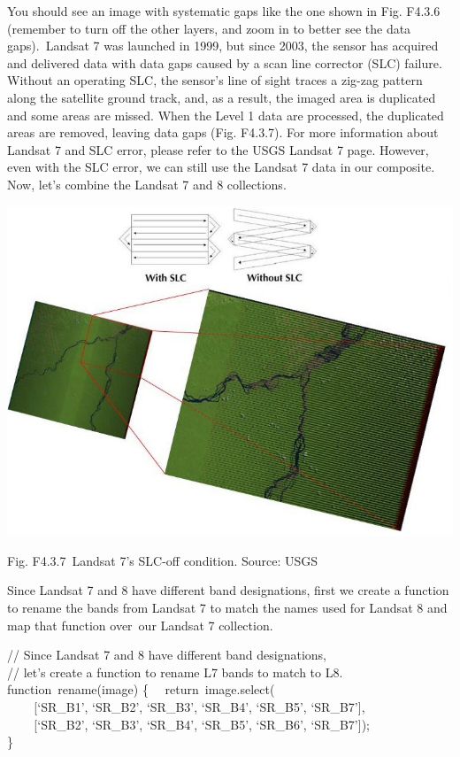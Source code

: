 \documentclass[
  letterpaper,
  DIV=11,
  numbers=noendperiod]{scrreprt}
\begin{document}
You should see an image with systematic gaps like the one shown in Fig.
F4.3.6 (remember to turn off the other layers, and zoom in to better see
the data gaps).~Landsat 7 was launched in 1999, but since 2003, the
sensor has acquired and delivered data with data gaps caused by a scan
line corrector (SLC) failure. Without an operating SLC, the sensor's
line of sight traces a zig-zag pattern along the satellite ground track,
and, as a result, the imaged area is duplicated and some areas are
missed. When the Level 1 data are processed, the duplicated areas are
removed, leaving data gaps (Fig. F4.3.7). For more information about
Landsat 7 and SLC error, please refer to the USGS Landsat 7 page.
However, even with the SLC error, we can still use the Landsat 7 data in
our composite. Now, let's combine the Landsat 7 and 8 collections.

\includegraphics{./F4/image54.png}

Fig. F4.3.7~Landsat 7's SLC-off condition. Source: USGS

Since Landsat 7 and 8 have different band designations, first we create
a function to rename the bands from Landsat 7 to match the names used
for Landsat 8 and map that function over~our Landsat 7 collection.

// Since Landsat 7 and 8 have different band designations,\\
// let's create a function to rename L7 bands to match to L8.\\
function~rename(image) \{~ ~return~image.select(\\
\hspace*{0.333em} ~ ~ ~{[}`SR\_B1', `SR\_B2', `SR\_B3', `SR\_B4',
`SR\_B5', `SR\_B7'{]},\\
\hspace*{0.333em} ~ ~ ~{[}`SR\_B2', `SR\_B3', `SR\_B4', `SR\_B5',
`SR\_B6', `SR\_B7'{]});\\
\}
\end{document}
